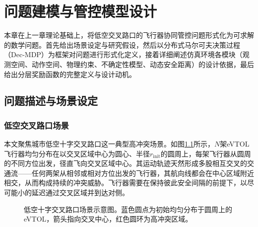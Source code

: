 \documentclass[12pt,a4paper,UTF8]{ctexbook}
\begin{document}
\chapter{问题建模与管控模型设计}

本章在上一章理论基础上，将低空交叉路口的飞行器协同管控问题形式化为可求解的数学问题。首先给出场景设定与研究假设，然后以分布式马尔可夫决策过程（Dec-MDP）为框架对问题进行形式化定义，接着详细阐述仿真环境各模块（观测空间、动作空间、物理约束、不确定性模型、动态安全距离）的设计依据，最后给出分层奖励函数的完整定义与设计动机。

\section{问题描述与场景设定}

\subsection{低空交叉路口场景}

本文聚焦城市低空十字交叉路口这一典型高冲突场景。如图\ref{fig:scenario}所示，$N$架eVTOL飞行器均匀分布在以交叉区域中心为圆心、半径$r_{\text{init}}$的圆周上，每架飞行器从圆周的不同方位出发，径直飞向交叉区域中心。其运动轨迹天然形成多股相互交叉的交通流——任何两架从相邻或相对方位出发的飞行器，其航向线都会在中心区域附近相交，从而构成持续的冲突威胁。飞行器需要在保持彼此安全间隔的前提下，以尽可能小的延迟通过交叉区域并到达对侧。

\begin{figure}[H]
    \centering
    \begin{minipage}[c]{0.72\textwidth}
    \centering
    \end{minipage}
    \caption{低空十字交叉路口场景示意图。蓝色圆点为初始均匀分布于圆周上的eVTOL，箭头指向交叉中心，红色圆环为高冲突区域。}
    \label{fig:scenario}
\end{figure}
\end{document}
